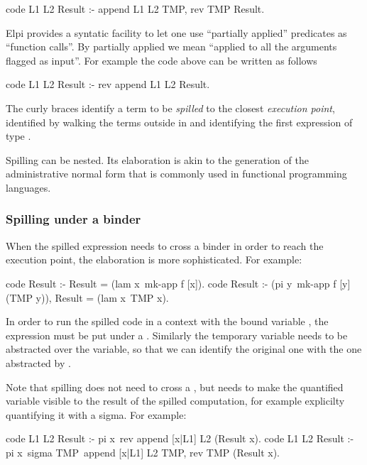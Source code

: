 \documentclass[a4paper, 11pt]{book}
\begin{document}
\begin{elpicode}
code L1 L2 Result :- append L1 L2 TMP, rev TMP Result.
\end{elpicode}

Elpi provides a syntatic facility to let one use
``partially applied'' predicates as ``function calls''.
By partially applied we mean ``applied to all the arguments flagged as input''.
For example the code above can be written as follows

\begin{elpicode}
code L1 L2 Result :- rev {append L1 L2} Result.
\end{elpicode}

The curly braces identify a term to be \emph{spilled} to the closest
\emph{execution point}, identified by walking the terms outside in and
identifying the first expression of type .

Spilling can be nested. Its elaboration is akin to the generation
of the administrative normal form that is commonly used in functional
programming languages.

\subsubsection{Spilling under a binder}

When the spilled expression needs to cross a binder in order to
reach the execution point, the elaboration is more sophisticated.
For example: 

\begin{elpicode}
code Result :- Result = (lam x\ {mk-app f [x]}).
code Result :- (pi y\ mk-app f [y] (TMP y)), Result = (lam x\ TMP x).
\end{elpicode}
  

In order to run the spilled code in a context with the bound variable
, the expression must be put under a . Similarly
the temporary variable needs to be abstracted over the variable, so
that we can identify the original one  with the one abstracted by
.

Note that spilling does not need to cross a , but
needs to make the quantified variable visible to the result of
the spilled computation, for example explicilty quantifying it
with a sigma. For example:

\begin{elpicode}
  code L1 L2 Result :- pi x\ rev {append [x|L1] L2} (Result x).
  code L1 L2 Result :- pi x\ sigma TMP\ append [x|L1] L2 TMP, rev TMP (Result x).
\end{elpicode}
\end{document}

